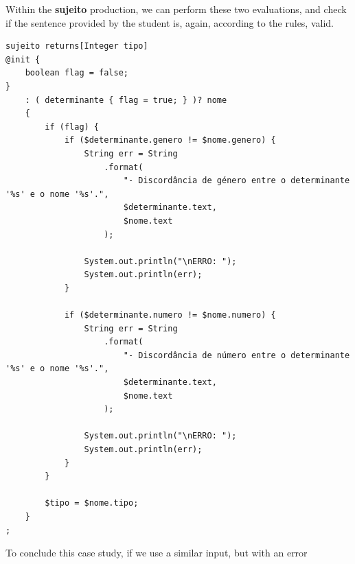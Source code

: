 
Within the \textbf{sujeito} production, we can perform these two evaluations, and check if the sentence provided by the student is, again, according to the rules, valid.

\begin{center}
\begin{minipage}{11cm}
\begin{Verbatim}[frame=single, framesep=2mm, fontsize=\tiny]
sujeito returns[Integer tipo]
@init {
    boolean flag = false;
}
    : ( determinante { flag = true; } )? nome
    {
        if (flag) {
            if ($determinante.genero != $nome.genero) {
                String err = String
                    .format(
                        "- Discordância de género entre o determinante '%s' e o nome '%s'.",
                        $determinante.text,
                        $nome.text
                    );

                System.out.println("\nERRO: ");
                System.out.println(err);
            }

            if ($determinante.numero != $nome.numero) {
                String err = String
                    .format(
                        "- Discordância de número entre o determinante '%s' e o nome '%s'.",
                        $determinante.text,
                        $nome.text
                    );

                System.out.println("\nERRO: ");
                System.out.println(err);
            }
        }

        $tipo = $nome.tipo;
    }
;
\end{Verbatim}
\end{minipage}
\end{center}


To conclude this case study, if we use a similar input, but with an error

